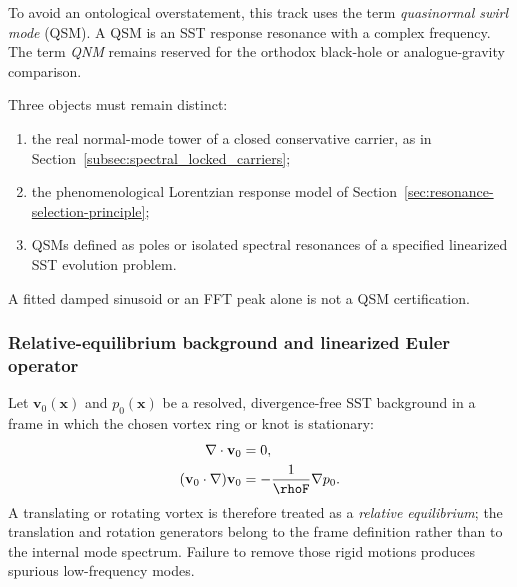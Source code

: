         To avoid an ontological overstatement, this track uses the term
        \emph{quasinormal swirl mode} (QSM).  A QSM is an SST response resonance with a
        complex frequency.  The term \emph{QNM} remains reserved for the orthodox
        black-hole or analogue-gravity comparison.

        Three objects must remain distinct:
        \begin{enumerate}
            \item the real normal-mode tower of a closed conservative carrier, as in
            Section~\ref{subsec:spectral_locked_carriers};
            \item the phenomenological Lorentzian response model of
            Section~\ref{sec:resonance-selection-principle};
            \item QSMs defined as poles or isolated spectral resonances of a specified
            linearized SST evolution problem.
        \end{enumerate}
        A fitted damped sinusoid or an FFT peak alone is not a QSM certification.

    \subsubsection*{Relative-equilibrium background and linearized Euler operator}

        Let \(\mathbf v_0(\mathbf x)\) and \(p_0(\mathbf x)\) be a resolved,
        divergence-free SST background in a frame in which the chosen vortex ring or
        knot is stationary:
        \begin{align}
            \nabla\cdot\mathbf v_0 &= 0,
            \\
            (\mathbf v_0\cdot\nabla)\mathbf v_0
            &=
            -\frac{1}{\rhoF}\nabla p_0.
            \label{eq:rt_qss_background_euler}
        \end{align}
        A translating or rotating vortex is therefore treated as a
        \emph{relative equilibrium}; the translation and rotation generators belong to
        the frame definition rather than to the internal mode spectrum.  Failure to
        remove those rigid motions produces spurious low-frequency modes.

